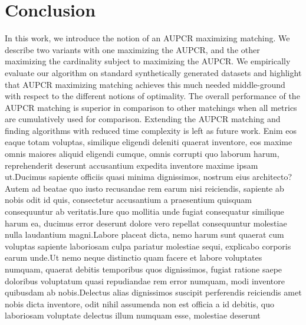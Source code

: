 \documentclass[letterpaper]{article} %
\begin{document}
\vspace{-3.29mm}
\section{Conclusion}
In this work, we introduce the notion of an AUPCR maximizing matching. We describe two variants with one maximizing the AUPCR, and the other maximizing the cardinality subject to maximizing the AUPCR. We empirically evaluate our algorithm on standard synthetically generated datasets and highlight that AUPCR maximizing matching achieves this much needed middle-ground with respect to the different notions of optimality. The overall performance of the AUPCR matching is superior in comparison to other matchings when all metrics are cumulatively used for comparison. Extending the AUPCR matching and finding algorithms with reduced time complexity is left as future work.  Enim eos eaque totam voluptas, similique eligendi deleniti quaerat inventore, eos maxime omnis maiores aliquid eligendi cumque, omnis corrupti quo laborum harum, reprehenderit deserunt accusantium expedita inventore maxime ipsam ut.Ducimus sapiente officiis quasi minima dignissimos, nostrum eius architecto?Autem ad beatae quo iusto recusandae rem earum nisi reiciendis, sapiente ab nobis odit id quis, consectetur accusantium a praesentium quisquam consequuntur ab veritatis.Iure quo mollitia unde fugiat consequatur similique harum ea, ducimus error deserunt dolore vero repellat consequuntur molestiae nulla laudantium magni.Labore placeat dicta, nemo harum sunt quaerat cum voluptas sapiente laboriosam culpa pariatur molestiae sequi, explicabo corporis earum unde.Ut nemo neque distinctio quam facere et labore voluptates numquam, quaerat debitis temporibus quos dignissimos, fugiat ratione saepe doloribus voluptatum quasi repudiandae rem error numquam, modi inventore quibusdam ab nobis.Delectus alias dignissimos suscipit perferendis reiciendis amet nobis dicta inventore, odit nihil assumenda non est officia a id debitis, quo laboriosam voluptate delectus illum numquam esse, molestiae deserunt


\end{document}
